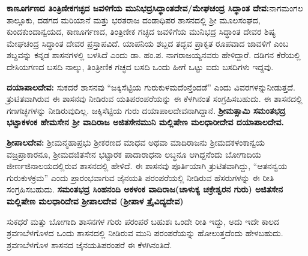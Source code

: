 \vskip 3pt

\textbf{ಕಾಣೂರ್ಗಣದ ತಿಂತ್ರಿಣೀಕಗಚ್ಛದ ಜವಳಿಗೆಯ ಮುನಿಭದ್ರಸಿದ್ಧಾಂತದೇವ/ಮೇಘಚಂದ್ರ ಸಿದ್ಧಾಂತ ದೇವ:}\break ನಾಗಮಂಗಲ ತಾಲ್ಲೂಕು, ದಡಗದ ಮರಿಯಾನೆ ಮತ್ತು ಭರತರಾಜ ದಂಡಾಧಿಪರ ಶಾಸನದಲ್ಲಿ ಶ‍್ರೀ ಮೂಲಸಂಘದ, ಕುಂದಕುಂದಾನ್ವಯದ, ಕಾಣೂರ್ಗಣದ, ತಿಂತ್ರಿಣೀಕ ಗಚ್ಛದ ಜವಳಿಗೆಯ ಮುನಿಭದ್ರ ಸಿದ್ಧಾಂತ ದೇವರ ಶಿಷ್ಯ ಮೇಘಚಂದ್ರ ಸಿದ್ಧಾಂತ ದೇವರ ಪ್ರಸ್ತಾಪವಿದೆ. ಯಾಪನಿಯ ಶಬ್ದದ ತದ್ಭವ ಪ್ರಾಕೃತ ರೂಪವಾದ ಜಾವಳಿಗೆ ಎಂಬ ಶಬ್ದವನ್ನು ಕನ್ನಡ ಶಾಸನಗಳಲ್ಲಿ ಬಳಸಿದೆ ಎಂದು ಡಾ. ಹಂ.ಪ. ನಾಗರಾಜಯ್ಯನವರು ಹೇಳಿದ್ದಾರೆ. ದಡಿಗನ ಕೆರೆಯಲ್ಲಿ ದೇಸಿಯಗಣದ ಬಸದಿ ನಾಲ್ಕು, ತಿಂತ್ರೀಣಿಕ ಗಚ್ಛದ ಬಸದಿ ಒಂದು ಹೀಗೆ ಒಟ್ಟು ಐದು ಬಸದಿಗಳು ಇದ್ದವು.

\textbf{ದಯಾಪಾಲದೇವ:} ಸುಕದರೆ ಶಾಸನವು “ಜಕ್ಕಿಸೆಟ್ಟಿಯ ಗುರುಕುಳಮದೆಂನ್ತೆಂದಡೆ” ಎಂದು ವಿವರಗಳನ್ನು\break ನೀಡುತ್ತದೆ. ತ್ರುಟಿತವಾಗಿರುವ ಈ ಶಾಸನವು ನೀಡಿರುವ ಯತಿಪರಂಪರೆಯನ್ನು ಈ ಕೆಳಗಿನಂತೆ ಸಂಗ್ರಹಿಸಬಹುದು. ಈ ಶಾಸನದಲ್ಲಿ ಗಣಗಚ್ಛಗಳನ್ನು ನೀಡಿರುವುದಿಲ್ಲ. ಜಕ್ಕಿಸೆಟ್ಟಿಯ ಗುರು ದಯಾಪಾಲದೇವನಾಗಿದ್ದಾನೆ. \textbf{ಶ‍್ರೀಮತ್ಸಾಮಿ ಸಮಂತಭದ್ರ \general{\enginline{-}} ಭಟ್ಟಾಕಳಂಕ \general{\enginline{-}} ಹೇಮಸೇನ \general{\enginline{-}} ಶ‍್ರೀ ವಾದಿರಾಜ \general{\enginline{-}} ಅಜಿತಸೇನಮುನಿ \general{\enginline{-}} ಮಲ್ಲಿಷೇಣ ಮಲಧಾರೀದೇವ \general{\enginline{-}} ದಯಾಪಾಲದೇವ. }

\textbf{ಶ‍್ರೀಪಾಲದೇವ:} ಶ‍್ರೀಮನ್ಮಹಾಪ್ರಭು ಶ‍್ರೀಕರಣದ ಮಾಧವ ಅಥವಾ ಮಾದಿರಾಜನು ಶ‍್ರೀಮದಕಳಂಕಾನ್ವಯ ವಜ್ರಪ್ರಾಕಾರನೂ, ಶ‍್ರೀಮದಜಿತಸೇನ ಭಟ್ಟಾರಕ ಪಾದಾರಾಧನಾ ಲಬ್ಧನೂ ಆಗಿದ್ದನೆಂದು ಬೋಗಾದಿಯ ಜೀರ್ಣಜಿನಾಲಯ\-ದಲ್ಲಿರುವ ಶಾಸನದಲ್ಲಿ ಹೇಳಿದೆ. ಈ ಶಾಸನವು ಪೂರ್ತಿಯಾಗಿ ತ್ರುಟಿತವಾಗಿದ್ದು, “ಆತನನ್ವಯ ಗುರುಕುಳಕ್ರಮ” ಎಂದು ಪ್ರಾರಂಭವಾಗುವ ಜೈನಯತಿ ಪರಂಪರೆಯಲ್ಲಿ ನೀಡಿರುವ ಹೆಸರುಗಳನ್ನು ಈ ರೀತಿ ಸಂಗ್ರಹಿಸಬಹುದು. \textbf{ಸಮಂತಭದ್ರ \general{\enginline{-}} ಸಿಂಹನಂದಿ \general{\enginline{-}} ಅಕಳಂಕ \general{\enginline{-}} ವಾದಿರಾಜ(ಚಾಳುಕ್ಯ ಚಕ್ರೇಶ್ವರನ ಗುರು) \general{\enginline{-}} ಅಜಿತಸೇನ \general{\enginline{-}} ಮಲ್ಲಿಷೇಣ ಮಲಧಾರಿದೇವ \general{\enginline{-}} ಶ‍್ರೀಪಾಲದೇವ (ಶ‍್ರೀಪಾಳ ತ್ರೈವಿದ್ಯದೇವ) }

ಸುಕಧರೆ ಮತ್ತು ಬೋಗಾದಿ ಶಾಸನಗಳ ಗುರು ಪರಂಪರೆ ಬಹುಶಃ ಒಂದೇ ರೀತಿ ಇದ್ದು, ಅದು ಇದೇ ಕಾಲದ ಶ್ರವಣಬೆಳಗೊಳದ ಒಂದು ಶಾಸನದಲ್ಲಿ ನೀಡಿರುವ ಮುನಿ ಪರಂಪರೆಯನ್ನು ಹೋಲುತ್ತದೆಂದು ಹೇಳಬಹುದು. ಶ್ರವಣಬೆಳಗೊಳ ಶಾಸನದ ಜೈನಯತಿಪರಂಪರೆ ಈ ಕೆಳಗಿನಂತಿದೆ.

